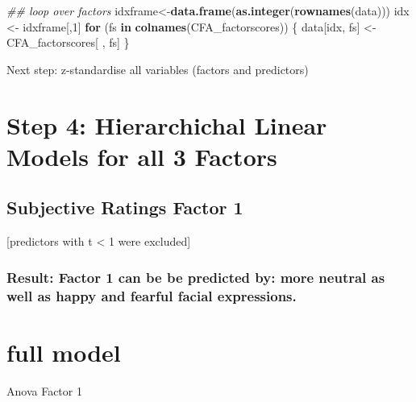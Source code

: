 \documentclass[
]{article}
\newenvironment{Shaded}{\begin{snugshade}}{\end{snugshade}}
\newcommand{\CommentTok}[1]{\textcolor[rgb]{0.56,0.35,0.01}{\textit{#1}}}
\newcommand{\ControlFlowTok}[1]{\textcolor[rgb]{0.13,0.29,0.53}{\textbf{#1}}}
\newcommand{\DecValTok}[1]{\textcolor[rgb]{0.00,0.00,0.81}{#1}}
\newcommand{\KeywordTok}[1]{\textcolor[rgb]{0.13,0.29,0.53}{\textbf{#1}}}
\newcommand{\NormalTok}[1]{#1}
\newcommand{\StringTok}[1]{\textcolor[rgb]{0.31,0.60,0.02}{#1}}
\begin{document}
\begin{Shaded}
\begin{Highlighting}[]
\CommentTok{\#\# loop over factors}
\NormalTok{idxframe\textless{}{-}}\KeywordTok{data.frame}\NormalTok{(}\KeywordTok{as.integer}\NormalTok{(}\KeywordTok{rownames}\NormalTok{(data)))}
\NormalTok{idx \textless{}{-}}\StringTok{ }\NormalTok{idxframe[,}\DecValTok{1}\NormalTok{]}
\ControlFlowTok{for}\NormalTok{ (fs }\ControlFlowTok{in} \KeywordTok{colnames}\NormalTok{(CFA\_factorscores)) \{}
\NormalTok{  data[idx, fs] \textless{}{-}}\StringTok{ }\NormalTok{CFA\_factorscores[ , fs]}
\NormalTok{\}}
\end{Highlighting}
\end{Shaded}

Next step: z-standardise all variables (factors and predictors)

\hypertarget{step-4-hierarchichal-linear-models-for-all-3-factors}{%
\section{Step 4: Hierarchichal Linear Models for all 3
Factors}\label{step-4-hierarchichal-linear-models-for-all-3-factors}}

\hypertarget{subjective-ratings-factor-1}{%
\subsection{Subjective Ratings Factor
1}\label{subjective-ratings-factor-1}}

{[}predictors with t \textless{} 1 were excluded{]}

\hypertarget{result-factor-1-can-be-be-predicted-by-more-neutral-as-well-as-happy-and-fearful-facial-expressions.}{%
\subsubsection{Result: Factor 1 can be be predicted by: more neutral as
well as happy and fearful facial
expressions.}\label{result-factor-1-can-be-be-predicted-by-more-neutral-as-well-as-happy-and-fearful-facial-expressions.}}

\hypertarget{full-model}{%
\section{full model}\label{full-model}}

Anova Factor 1
\end{document}

